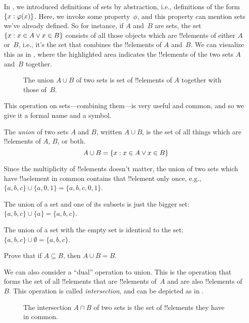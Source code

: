 \documentclass[../../../include/open-logic-section]{subfiles}
\begin{document}

\begin{explain}
In , we introduced definitions of sets by
abstraction, i.e., definitions of the form $\{ x : \varphi(x) \}$.
Here, we invoke some property~$\phi$, and this property can mention
sets we've already defined. So for instance, if $A$ and~$B$ are sets,
the set $\{ x : x \in A \lor x \in B \}$ consists of all those
objects which are !!{element}s of either $A$ or~$B$, i.e., it's the
set that combines the !!{element}s of $A$ and~$B$. We can visualize
this as in , where the highlighted area indicates the
!!{element}s of the two sets $A$ and~$B$ together.

\begin{figure}
  \caption{The union $A \cup B$ of two sets is set of !!{element}s of
   $A$ together with those of~$B$.}
\end{figure}

This operation on sets---combining them---is very useful and common,
and so we give it a formal name and a symbol. 
\end{explain}

\begin{defn}[Union]
The \emph{union} of two sets $A$ and $B$, written $A \cup B$, is the
set of all things which are !!{element}s of $A$, $B$, or both.
\[
A \cup B = \{ x : x \in A \lor x \in B \}
\]
\end{defn}

\begin{ex}
Since the multiplicity of !!{element}s doesn't matter, the union of two
sets which have !!a{element} in common contains that !!{element} only once,
e.g., $\{ a, b, c\} \cup \{ a, 0, 1\} = \{a, b, c, 0, 1\}$.

The union of a set and one of its subsets is just the bigger set: $\{a,
b, c \} \cup \{a \} = \{a, b, c\}$.

The union of a set with the empty set is identical to the set: $\{a,
b, c \} \cup \emptyset = \{a, b, c \}$.
\end{ex}

\begin{prob}
Prove that if $A \subseteq B$, then $A \cup B = B$.
\end{prob}

\begin{explain}
We can also consider a ``dual'' operation to union. This is the
operation that forms the set of all !!{element}s that are !!{element}s
of~$A$ and are also !!{element}s of~$B$. This operation is called 
\emph{intersection}, and can be depicted as in .
\begin{figure}
  \caption{The intersection $A \cap B$ of two sets is the set of
    !!{element}s they have in common.}
\end{figure}
\end{explain}
\end{document}
